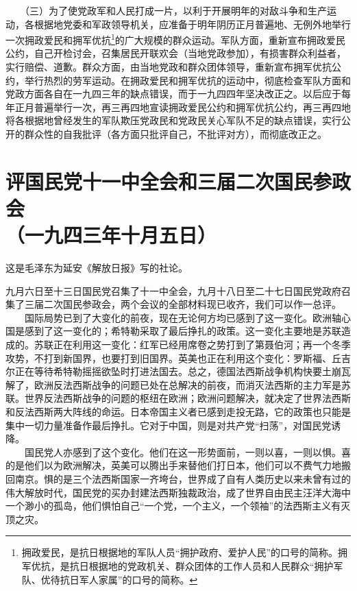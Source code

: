 \documentclass[cn,11pt,chinese]{elegantbook}
\def\myformat#1{\hfil\hfil #1}
\begin{document}
　　（三）为了使党政军和人民打成一片，以利于开展明年的对敌斗争和生产运动，各根据地党委和军政领导机关，应准备于明年阴历正月普遍地、无例外地举行一次拥政爱民和拥军优抗\footnote[3]{ 拥政爱民，是抗日根据地的军队人员“拥护政府、爱护人民”的口号的简称。拥军优抗，是抗日根据地的党政机关、群众团体的工作人员和人民群众“拥护军队、优待抗日军人家属”的口号的简称。}的广大规模的群众运动。军队方面，重新宣布拥政爱民公约，自己开检讨会，召集居民开联欢会（当地党政参加），有损害群众利益者，实行赔偿、道歉。群众方面，由当地党政和群众团体领导，重新宣布拥军优抗公约，举行热烈的劳军运动。在拥政爱民和拥军优抗的运动中，彻底检查军队方面和党政方面各自在一九四三年的缺点错误，而于一九四四年坚决改正之。以后应于每年正月普遍举行一次，再三再四地宣读拥政爱民公约和拥军优抗公约，再三再四地将各根据地曾经发生的军队欺压党政民和党政民关心军队不足的缺点错误，实行公开的群众性的自我批评（各方面只批评自己，不批评对方），而彻底改正之。\\
\newpage\section*{\myformat{评国民党十一中全会和三届二次国民参政会}\\\myformat{（一九四三年十月五日）}}
\begin{introduction}\item  这是毛泽东为延安《解放日报》写的社论。\end{introduction}
九月六日至十三日国民党召集了十一中全会，九月十八日至二十七日国民党政府召集了三届二次国民参政会，两个会议的全部材料现已收齐，我们可以作一总评。\\
　　国际局势已到了大变化的前夜，现在无论何方均已感到了这一变化。欧洲轴心国是感到了这一变化的；希特勒采取了最后挣扎的政策。这一变化主要地是苏联造成的。苏联正在利用这一变化：红军已经用席卷之势打到了第聂伯河；再一个冬季攻势，不打到新国界，也要打到旧国界。英美也正在利用这个变化：罗斯福、丘吉尔正在等待希特勒摇摇欲坠时打进法国去。总之，德国法西斯战争机构快要土崩瓦解了，欧洲反法西斯战争的问题已处在总解决的前夜，而消灭法西斯的主力军是苏联。世界反法西斯战争的问题的枢纽在欧洲；欧洲问题解决，就决定了世界法西斯和反法西斯两大阵线的命运。日本帝国主义者已感到走投无路，它的政策也只能是集中一切力量准备作最后挣扎。它对于中国，则是对共产党“扫荡”，对国民党诱降。\\
　　国民党人亦感到了这个变化。他们在这一形势面前，一则以喜，一则以惧。喜的是他们以为欧洲解决，英美可以腾出手来替他们打日本，他们可以不费气力地搬回南京。惧的是三个法西斯国家一齐垮台，世界成了自有人类历史以来未曾有过的伟大解放时代，国民党的买办封建法西斯独裁政治，成了世界自由民主汪洋大海中一个渺小的孤岛，他们惧怕自己“一个党，一个主义，一个领袖”的法西斯主义有灭顶之灾。\\
\end{document}
